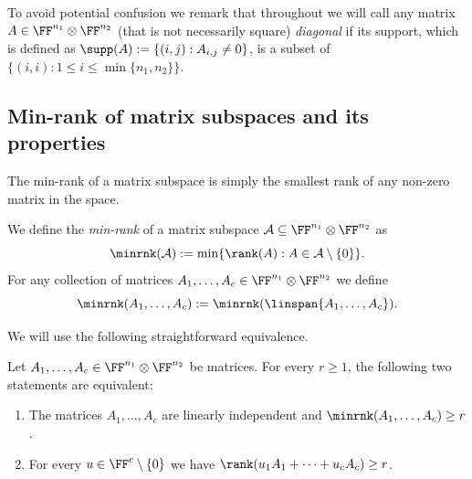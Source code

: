 To avoid potential confusion we remark that throughout we will call any matrix $A\in \FF^{n_1} \otimes \FF^{n_2}$ (that is not necessarily square) \emph{diagonal} if its support, which is defined as $\supp(A) := \{(i,j) : A_{i,j} \neq 0\}$, is a subset of $\{(i,i): 1\leq i\leq \min\{n_1, n_2\}\}$.
%

%
%


\subsection{Min-rank of matrix subspaces and its properties}\label{subsec:minrank} %
%
%

%
\newcommand{\StrExC}{T_{\textnormal{NA},c,n}}
%
%
%
%
%
%
%

%
%
%

%

%

%

%
The min-rank of a matrix subspace is simply the smallest rank of any non-zero matrix in the space. 


\begin{definition}
    We define the \emph{min-rank} of a matrix subspace $\mathcal{A} \subseteq \FF^{n_1} \otimes \FF^{n_2}$ as
    \[
    \minrnk(\mathcal{A}):=\min\{\rank(A):A\in\mathcal{A}\setminus\{0\}\}.
    \]
    For any collection of matrices $A_1,
    \ldots,A_c \in \FF^{n_1} \otimes \FF^{n_2}$ we define \[
    \minrnk(A_1,\dots,A_c):=\minrnk(\linspan\{A_1,\dots,A_c\}).
    \]
\end{definition}



%
%
%

%
%
%
%

We will use the following straightforward equivalence. %

\begin{lemma}\label{lem:minrank-nontrivial-lin-comb}
    Let $A_1,\dots,A_c \in \FF^{n_1} \otimes \FF^{n_2}$ be matrices. %
    For every $r\geq1$, the following two statements are equivalent:
    \begin{enumerate}[\upshape(a)]
        \item The matrices $A_1,\dots,A_c$ are linearly independent and $\minrnk(A_1,\dots,A_c)\geq r$.
        \item For every $u \in \FF^c \setminus \{0\}$ we have $\rank(u_1 A_1 + \cdots + u_c A_c) \geq r$.
    \end{enumerate} 
\end{lemma}
